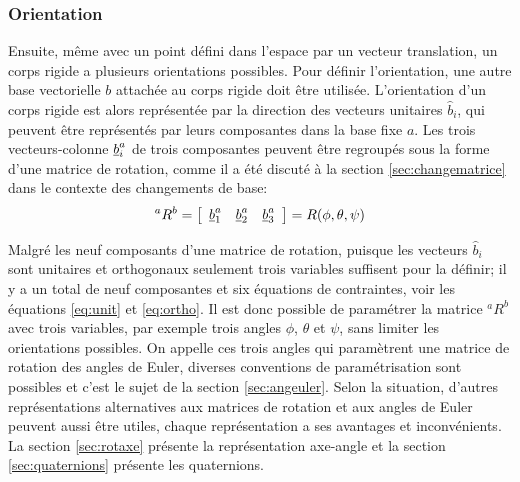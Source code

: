 \subsubsection{Orientation}
%
Ensuite, même avec un point défini dans l'espace par un vecteur translation, un corps rigide a plusieurs orientations possibles. Pour définir l'orientation, une autre base vectorielle $b$ attachée au corps rigide doit être utilisée. L'orientation d'un corps rigide est alors représentée par la direction des vecteurs unitaires $\hat{b}_i$, qui peuvent être représentés par leurs composantes dans la base fixe $a$. Les trois vecteurs-colonne $\underline{b}_i^a$ de trois composantes peuvent être regroupés sous la forme d'une matrice de rotation, comme il a été discuté à la section \ref{sec:changematrice} dans le contexte des changements de base:
\begin{equation}
	^aR^b = \left[ \begin{array}{ c c c } \underline{b}_1^a &  \underline{b}_2^a & \underline{b}_3^a  \end{array} \right] = R(\phi,\theta,\psi)
\end{equation}

Malgré les neuf composants d'une matrice de rotation, puisque les vecteurs $\hat{b}_i$ sont unitaires et orthogonaux seulement trois variables suffisent pour la définir; il y a un total de neuf composantes et six équations de contraintes, voir les équations \eqref{eq:unit} et \eqref{eq:ortho}. Il est donc possible de paramétrer la matrice $^aR^b$ avec trois variables, par exemple trois angles $\phi$, $\theta$ et $\psi$, sans limiter les orientations possibles. On appelle ces trois angles qui paramètrent une matrice de rotation des angles de Euler, diverses conventions de paramétrisation sont possibles et c'est le sujet de la section \ref{sec:angeuler}. Selon la situation, d'autres représentations alternatives aux matrices de rotation et aux angles de Euler peuvent aussi être utiles, chaque représentation a ses avantages et inconvénients. La section \ref{sec:rotaxe} présente la représentation axe-angle et la section \ref{sec:quaternions} présente les quaternions.


